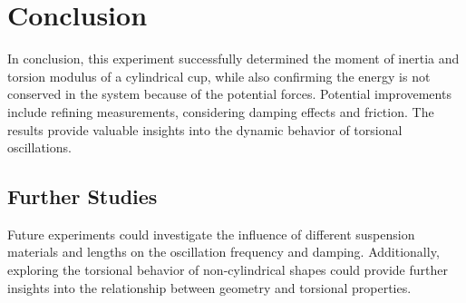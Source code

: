 \chapter{Conclusion}

In conclusion, this experiment successfully determined the moment of inertia and torsion modulus of a cylindrical cup, while also confirming the energy is not conserved in the system because of the potential forces. Potential improvements include refining measurements, considering damping effects and friction. The results provide valuable insights into the dynamic behavior of torsional oscillations.

\section*{Further Studies}

Future experiments could investigate the influence of different suspension materials and lengths on the oscillation frequency and damping. Additionally, exploring the torsional behavior of non-cylindrical shapes could provide further insights into the relationship between geometry and torsional properties. 
